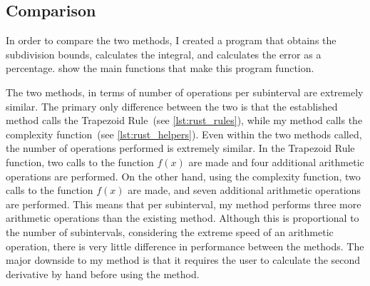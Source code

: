 \documentclass{paper}
\begin{document}
\subsection{Comparison}
\label{sec:comparison}
In order to compare the two methods, I created a program that obtains the subdivision bounds, calculates the integral, and calculates the error as a percentage.
 show the main functions that make this program function.
%




%
The two methods, in terms of number of operations per subinterval are extremely similar.
The primary only difference between the two is that the established method calls the Trapezoid Rule~(see \cref{lst:rust_rules}), while my method calls the complexity function~(see \cref{lst:rust_helpers}).
Even within the two methods called, the number of operations performed is extremely similar.
In the Trapezoid Rule function, two calls to the function \(f(x)\) are made and four additional arithmetic operations are performed.
On the other hand, using the complexity function, two calls to the function \(f(x)\) are made, and seven additional arithmetic operations are performed.
This means that per subinterval, my method performs three more arithmetic operations than the existing method.
Although this is proportional to the number of subintervals, considering the extreme speed of an arithmetic operation, there is very little difference in performance between the methods.
The major downside to my method is that it requires the user to calculate the second derivative by hand before using the method.
\end{document}
